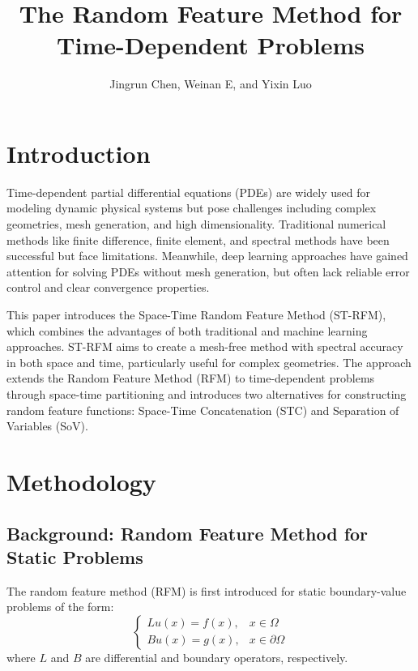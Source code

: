 \documentclass[11pt]{article}
\title{The Random Feature Method for Time-Dependent Problems}
\author{Jingrun Chen, Weinan E, and Yixin Luo}
\date{}
\begin{document}
\maketitle

\section{Introduction}

Time-dependent partial differential equations (PDEs) are widely used for modeling dynamic physical systems but pose challenges including complex geometries, mesh generation, and high dimensionality. Traditional numerical methods like finite difference, finite element, and spectral methods have been successful but face limitations. Meanwhile, deep learning approaches have gained attention for solving PDEs without mesh generation, but often lack reliable error control and clear convergence properties.

This paper introduces the Space-Time Random Feature Method (ST-RFM), which combines the advantages of both traditional and machine learning approaches. ST-RFM aims to create a mesh-free method with spectral accuracy in both space and time, particularly useful for complex geometries. The approach extends the Random Feature Method (RFM) to time-dependent problems through space-time partitioning and introduces two alternatives for constructing random feature functions: Space-Time Concatenation (STC) and Separation of Variables (SoV).

\section{Methodology}

\subsection{Background: Random Feature Method for Static Problems}

The random feature method (RFM) is first introduced for static boundary-value problems of the form:
\begin{equation}
\begin{cases}
Lu(x) = f(x), & x \in \Omega \\
Bu(x) = g(x), & x \in \partial\Omega
\end{cases}
\end{equation}
where $L$ and $B$ are differential and boundary operators, respectively.
\end{document}
